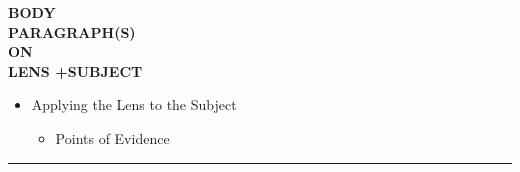 \documentclass{article}
\begin{document}
\begin{paracol}{3}
	\switchcolumn[0]
	\noindent \textbf{BODY}\\
	\noindent \textbf{PARAGRAPH(S)}\\
	\noindent \textbf{ON}\\
	\noindent \textbf{LENS +SUBJECT}
	\switchcolumn[2]
\begin{itemize}
	\item Applying the Lens to the Subject
	\begin{itemize}
		\item  Points of Evidence
	\end{itemize}
\end{itemize}
\end{paracol}
\noindent\rule{16cm}{0.4pt}

\end{document}
